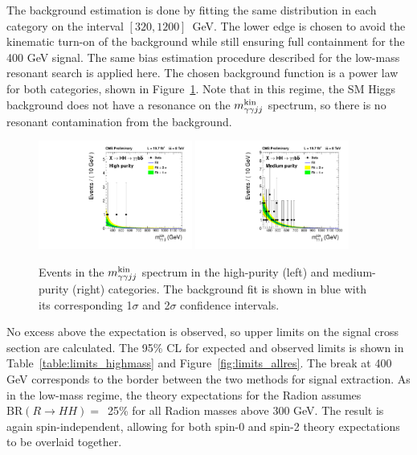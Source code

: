 The background estimation is done by fitting the same distribution in each category on the interval
$[320, 1200]$~GeV. The lower edge is chosen to avoid the kinematic turn-on of the background
while still ensuring full containment for the 400 GeV signal. The same bias estimation procedure
described for the low-mass resonant search is applied here. The chosen background function is a power
law for both categories, shown in Figure~\ref{fig:datafit_4body}. Note that in this regime,
the SM Higgs background does not have a resonance on the $m_{\gamma\gamma jj}^{\rm kin}$ spectrum, so
there is no resonant contamination from the background.

\begin{figure}[ht!]
 \begin{center}
   \includegraphics[width=0.45\textwidth]{figures/results/databkgoversig_cat0_4body.pdf}
   \includegraphics[width=0.45\textwidth]{figures/results/databkgoversig_cat1_4body.pdf}
 \end{center}
\caption{Events in the $m_{\gamma\gamma jj}^{\rm kin}$ spectrum in the high-purity (left) and medium-purity (right)
categories. The background fit is shown in blue
with its corresponding 1$\sigma$ and 2$\sigma$ confidence intervals.}
\label{fig:datafit_4body}
\end{figure}

No excess above the expectation is observed, so upper limits on the signal cross section are calculated.
The 95\% CL for expected and observed limits is
shown in Table~\ref{table:limits_highmass} and Figure~\ref{fig:limits_allres}.
The break at 400 GeV corresponds
to the border between the two methods for signal extraction.
As in the low-mass regime, the theory expectations for the Radion assumes
$\text{BR}(R\rightarrow HH) =$~25\% for all Radion masses above 300 GeV. The result is again
spin-independent, allowing for both spin-0 and spin-2 theory expectations to be overlaid together.

